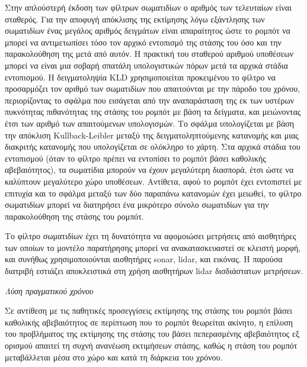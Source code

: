 Στην απλούστερή έκδοση των φίλτρων σωματιδίων ο αριθμός των τελευταίων είναι
σταθερός. Για την αποφυγή απόκλισης της εκτίμησης λόγω εξάντλησης των
σωματιδίων \cite{thrun2005probabilistic} ένας μεγάλος αριθμός δειγμάτων είναι
απαραίτητος ώστε το ρομπότ να μπορεί να αντιμετωπίσει τόσο τον αρχικό εντοπισμό
της στάσης του όσο και την παρακολούθηση της μετά από αυτόν. Η πρακτική του
σταθερού αριθμού υποθέσεων μπορεί να είναι μια σοβαρή σπατάλη υπολογιστικών
πόρων μετά τα αρχικά στάδια εντοπισμού. Η δειγματοληψία KLD \cite{Fox2001}
χρησιμοποιείται προκειμένου το φίλτρο να προσαρμόζει τον αριθμό των σωματιδίων
που απαιτούνται με την πάροδο του χρόνου, περιορίζοντας το σφάλμα που εισάγεται
από την αναπαράσταση της εκ των υστέρων πυκνότητας πιθανότητας της στάσης του
ρομπότ με βάση τα δείγματα, και μειώνοντας έτσι των αριθμό των απαιτούμενων
υπολογισμών. Το σφάλμα υπολογίζεται με βάση την απόκλιση Kullback-Leibler
μεταξύ της δειγματοληπτούμενης κατανομής και μιας διακριτής κατανομής που
υπολογίζεται σε ολόκληρο το χάρτη. Στα αρχικά στάδια του εντοπισμού (όταν το
φίλτρο πρέπει να εντοπίσει το ρομπότ βάσει καθολικής αβεβαιότητος), τα
σωματίδια μπορούν να έχουν μεγαλύτερη διασπορά, έτσι ώστε να καλύπτουν
μεγαλύτερο χώρο υποθέσεων. Αντίθετα, αφού το ρομπότ έχει εντοπιστεί με επιτυχία
και το σφάλμα μεταξύ των δύο παραπάνω κατανομών έχει μειωθεί, το φίλτρο
σωματιδίων μπορεί να διατηρήσει ένα μικρότερο σύνολο σωματιδίων για την
παρακολούθηση της στάσης του ρομπότ.

Το φίλτρο σωματιδίων έχει τη δυνατότητα να αφομοιώσει μετρήσεις από αισθητήρες
των οποίων το μοντέλο παρατήρησης μπορεί να ανακατασκευαστεί σε κλειστή μορφή,
και συνήθως χρησιμοποιούνται αισθητήρες sonar, lidar, και εικόνας. Η παρούσα
διατριβή εστιάζει αποκλειστικά στη χρήση αισθητήρων lidar δισδιάστατων
μετρήσεων.

\begin{gg_box}
\begin{remark}
  \textit{Λύση πραγματικού χρόνου}
  \label{remark:01_01_02_02:03}

  Σε αντίθεση με τις παθητικές προσεγγίσεις εκτίμησης της στάσης του ρομπότ
  βάσει καθολικής αβεβαιότητος σε περίπτωση που το ρομπότ θεωρείται ακίνητο,
  η επίλυση του προβλήματος της εκτίμησης της στάσης του βάσει πεπερασμένης
  αβεβαιότητος εξ ορισμού απαιτεί τη συχνή ανανέωση εκτιμήσεων στάσης, καθώς η
  στάση του ρομπότ μεταβάλλεται μέσα στο χώρο και κατά τη διάρκεια του χρόνου.
\end{remark}
\end{gg_box}


